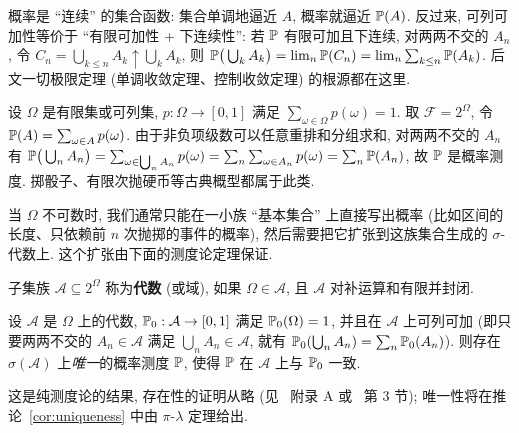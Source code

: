 \begin{intuition}
概率是 ``连续'' 的集合函数: 集合单调地逼近 $A$, 概率就逼近 $\P(A)$. 反过来, 可列可加性等价于 ``有限可加性 + 下连续性'': 若 $\P$ 有限可加且下连续, 对两两不交的 $A_n$, 令 $C_n=\bigcup_{k\le n}A_k\uparrow\bigcup_k A_k$, 则 $\P\big(\bigcup_k A_k\big)=\lim_n\P(C_n)=\lim_n\sum_{k\le n}\P(A_k)$. 后文一切极限定理 (单调收敛定理、控制收敛定理) 的根源都在这里.
\end{intuition}

\begin{example}[离散概率空间]\label{ex:discrete-space}
设 $\Omega$ 是有限集或可列集, $p:\Omega\to[0,1]$ 满足 $\sum_{\omega\in\Omega}p(\omega)=1$. 取 $\mathcal{F}=2^\Omega$, 令 $\P(A)=\sum_{\omega\in A}p(\omega)$. 由于非负项级数可以任意重排和分组求和, 对两两不交的 $A_n$ 有
$\P\big(\bigcup_n A_n\big)=\sum_{\omega\in\bigcup_n A_n}p(\omega)=\sum_n\sum_{\omega\in A_n}p(\omega)=\sum_n\P(A_n)$, 故 $\P$ 是概率测度. 掷骰子、有限次抛硬币等古典概型都属于此类.
\end{example}

当 $\Omega$ 不可数时, 我们通常只能在一小族 ``基本集合'' 上直接写出概率 (比如区间的长度、只依赖前 $n$ 次抛掷的事件的概率), 然后需要把它扩张到这族集合生成的 $\sigma$-代数上. 这个扩张由下面的测度论定理保证.

\begin{definition}[代数]\label{def:algebra}
子集族 $\mathcal{A}\subseteq2^\Omega$ 称为\textbf{代数} (或域), 如果 $\Omega\in\mathcal{A}$, 且 $\mathcal{A}$ 对补运算和有限并封闭.
\end{definition}

\begin{theorem}\label{thm:caratheodory}
设 $\mathcal{A}$ 是 $\Omega$ 上的代数, $\P_0:\mathcal{A}\to[0,1]$ 满足 $\P_0(\Omega)=1$, 并且在 $\mathcal{A}$ 上可列可加 (即只要两两不交的 $A_n\in\mathcal{A}$ 满足 $\bigcup_n A_n\in\mathcal{A}$, 就有 $\P_0(\bigcup_n A_n)=\sum_n\P_0(A_n)$). 则存在 $\sigma(\mathcal{A})$ 上\emph{唯一}的概率测度 $\P$, 使得 $\P$ 在 $\mathcal{A}$ 上与 $\P_0$ 一致.
\end{theorem}

这是纯测度论的结果, 存在性的证明从略 (见~\cite{durrett} 附录 A 或~\cite{billingsley} 第 3 节); 唯一性将在推论~\ref{cor:uniqueness} 中由 $\pi$-$\lambda$ 定理给出.

